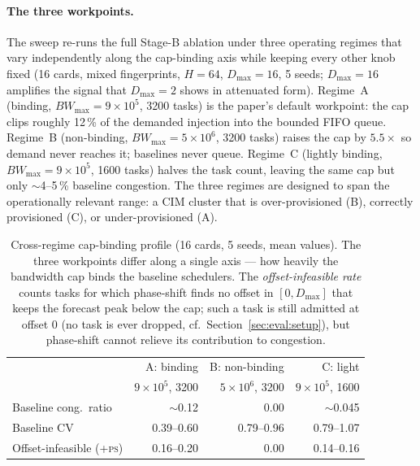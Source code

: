 \documentclass[letterpaper,twocolumn,10pt]{article}
\begin{document}
\paragraph{The three workpoints.} The sweep re-runs the full Stage-B ablation under three operating regimes that vary independently along the cap-binding axis while keeping every other knob fixed (16 cards, mixed fingerprints, $H\!=\!64$, $D_{\max}\!=\!16$, 5 seeds; $D_{\max}\!=\!16$ amplifies the signal that $D_{\max}\!=\!2$ shows in attenuated form). Regime~A (binding, $BW_{\max}\!=\!9\!\times\!10^{5}$, 3200 tasks) is the paper's default workpoint: the cap clips roughly 12\,\% of the demanded injection into the bounded FIFO queue. Regime~B (non-binding, $BW_{\max}\!=\!5\!\times\!10^{6}$, 3200 tasks) raises the cap by $5.5\!\times$ so demand never reaches it; baselines never queue. Regime~C (lightly binding, $BW_{\max}\!=\!9\!\times\!10^{5}$, 1600 tasks) halves the task count, leaving the same cap but only $\sim$4--5\,\% baseline congestion. The three regimes are designed to span the operationally relevant range: a CIM cluster that is over-provisioned (B), correctly provisioned (C), or under-provisioned (A).

\begin{table}[t]
\centering
\caption{Cross-regime cap-binding profile (16 cards, 5 seeds, mean values). The three workpoints differ along a single axis --- how heavily the bandwidth cap binds the baseline schedulers. The \emph{offset-infeasible rate} counts tasks for which phase-shift finds no offset in $[0, D_{\max}]$ that keeps the forecast peak below the cap; such a task is still admitted at offset $0$ (no task is ever dropped, cf.\ Section~\ref{sec:eval:setup}), but phase-shift cannot relieve its contribution to congestion.}
\label{tab:q2_regime_profile}
\small
\begin{tabular}{lrrr}
\toprule
 & A: binding & B: non-binding & C: light \\
 & $9\!\times\!10^{5}$, 3200 & $5\!\times\!10^{6}$, 3200 & $9\!\times\!10^{5}$, 1600 \\
\midrule
Baseline cong.\ ratio & $\sim$0.12      & 0.00 & $\sim$0.045 \\
Baseline CV      & 0.39--0.60      & 0.79--0.96 & 0.79--1.07 \\
Offset-infeasible (\textsc{+ps}) & 0.16--0.20 & 0.00 & 0.14--0.16 \\
\bottomrule
\end{tabular}
\end{table}
\end{document}
